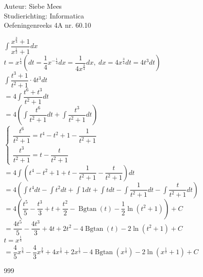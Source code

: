 \documentclass[a4paper]{article}
\newcommand{\Bgtan}{\operatorname{Bgtan}}
\begin{document}
  
\noindent \large Auteur: Siebe Mees \\
\noindent \large Studierichting: Informatica\\
\noindent \large Oefeningenreeks 4A nr. 60.10\\

\medskip

\normalsize

$ \displaystyle\int \dfrac{x^{\tfrac{3}{4}} + 1}{x^{\tfrac{1}{2}} + 1} dx $\\

$ t = x^{\tfrac{1}{4}} \left( dt = \dfrac{1}{4}x^{-\tfrac{1}{4}}dx = \dfrac{1}{4x^{\tfrac{3}{4}}}dx,\; dx = 4x^{\tfrac{3}{4}}dt = 4t^3 dt \right) $\\

$ \displaystyle\int \dfrac{t^3 + 1}{t^2 + 1} \cdot 4t^3 dt $\\

$ = 4 \displaystyle\int \dfrac{t^6 + t^3}{t^2 + 1} dt $\\

$ = 4 \left( \displaystyle\int \dfrac{t^6}{t^2 + 1} dt + \displaystyle\int \dfrac{t^3}{t^2 + 1} dt \right) $\\

$ \left \{
\begin{array}{l}
\dfrac{t^6}{t^2 + 1} = t^4 - t^2 + 1 - \dfrac{1}{t^2 + 1} \\

\dfrac{t^3}{t^2 + 1} = t - \dfrac{t}{t^2 + 1}
\end{array}
\right . $\\

$ = 4 \displaystyle\int \left( t^4 - t^2 + 1 + t - \dfrac{1}{t^2 + 1} - \dfrac{t}{t^2 + 1} \right) dt $\\

$ = 4 \left( \displaystyle\int t^4 dt - \displaystyle\int t^2 dt + \displaystyle\int 1 dt + \displaystyle\int t dt - \displaystyle\int \dfrac{1}{t^2 + 1} dt - \displaystyle\int \dfrac{t}{t^2 + 1} dt \right) $\\

$ = 4 \left( \dfrac{t^5}{5} - \dfrac{t^3}{3} + t + \dfrac{t^2}{2} - \Bgtan(t) - \dfrac{1}{2}\ln(t^2 + 1) \right) + C $\\

$ = \dfrac{4t^5}{5} - \dfrac{4t^3}{3} + 4t + 2t^2 - 4\Bgtan(t) - 2\ln(t^2 + 1) + C $\\

$ t = x^{\tfrac{1}{4}} $\\

$ = \dfrac{4}{5}x^{\tfrac{5}{4}} - \dfrac{4}{3}x^{\tfrac{3}{4}} + 4x^{\tfrac{1}{4}} + 2x^{\tfrac{1}{2}} - 4\Bgtan(x^{\tfrac{1}{4}}) - 2\ln(x^{\tfrac{1}{2}} + 1) + C $\\

\begin{thebibliography}{999}
\end{thebibliography}
\end{document}
